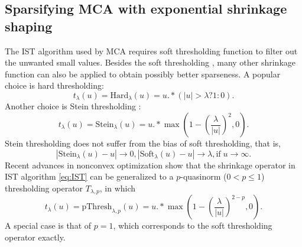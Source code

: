 \subsection{Sparsifying MCA with exponential shrinkage shaping}

The IST algorithm used by MCA requires soft thresholding function to filter out the unwanted small values. Besides the soft thresholding \citep{donoho1995noising}, many other shrinkage function can also be applied to obtain possibly better sparseness. A popular choice is hard thresholding:
\begin{equation}
t_{\lambda}(u)=\mathrm{Hard}_{\lambda}(u)=u.*(|u|>\lambda?1:0).
\end{equation}
Another choice is Stein thresholding \citep{peyre2010advanced}:
\begin{equation}\label{eq:stein}
t_{\lambda}(u)=\mathrm{Stein}_{\lambda}(u)=u.*\max\left(1-(\frac{\lambda}{|u|})^{2},0\right).
\end{equation}
Stein thresholding does not suffer from the bias of soft thresholding, that is,
\begin{equation}
|\mathrm{Stein}_{\lambda}(u)-u| \rightarrow 0, |\mathrm{Soft}_{\lambda}(u)-u|\rightarrow \lambda,
\mathrm{if}\; u\rightarrow\infty.
\end{equation}
Recent advances in nonconvex optimization \citep{chartrand2012,chartrand2013generalized,chartrand2013nonconvex} show that the shrinkage operator in IST algorithm \eqref{eq:IST} can be generalized to a $p$-quasinorm ($0<p\leq1$) thresholding operator $T_{\lambda,p}$, in which
\begin{equation}\label{eq:pthresh}
t_{\lambda}(u)=\mathrm{pThresh}_{\lambda,p}(u)=u.*\max\left(1-(\frac{\lambda}{|u|})^{2-p},0\right).
\end{equation}
A special case is that of $p=1$, which corresponds to the soft thresholding operator exactly.



